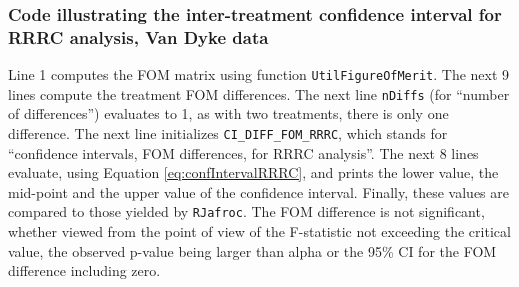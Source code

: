 \documentclass[
]{book}
\newenvironment{Shaded}{\begin{snugshade}}{\end{snugshade}}
\newcommand{\CommentTok}[1]{\textcolor[rgb]{0.56,0.35,0.01}{\textit{#1}}}
\newcommand{\DecValTok}[1]{\textcolor[rgb]{0.00,0.00,0.81}{#1}}
\newcommand{\NormalTok}[1]{#1}
\newcommand{\OperatorTok}[1]{\textcolor[rgb]{0.81,0.36,0.00}{\textbf{#1}}}
\newcommand{\StringTok}[1]{\textcolor[rgb]{0.31,0.60,0.02}{#1}}
\begin{document}
\begin{Shaded}
\end{Shaded}

\hypertarget{code-illustrating-the-inter-treatment-confidence-interval-for-rrrc-analysis-van-dyke-data}{%
\subsubsection{Code illustrating the inter-treatment confidence interval for RRRC analysis, Van Dyke data}\label{code-illustrating-the-inter-treatment-confidence-interval-for-rrrc-analysis-van-dyke-data}}

Line 1 computes the FOM matrix using function \texttt{UtilFigureOfMerit}. The next 9 lines compute the treatment FOM differences. The next line \texttt{nDiffs} (for ``number of differences'') evaluates to 1, as with two treatments, there is only one difference. The next line initializes \texttt{CI\_DIFF\_FOM\_RRRC}, which stands for ``confidence intervals, FOM differences, for RRRC analysis''. The next 8 lines evaluate, using Equation \eqref{eq:confIntervalRRRC}, and prints the lower value, the mid-point and the upper value of the confidence interval. Finally, these values are compared to those yielded by \texttt{RJafroc}. The FOM difference is not significant, whether viewed from the point of view of the F-statistic not exceeding the critical value, the observed p-value being larger than alpha or the 95\% CI for the FOM difference including zero.
\end{document}
